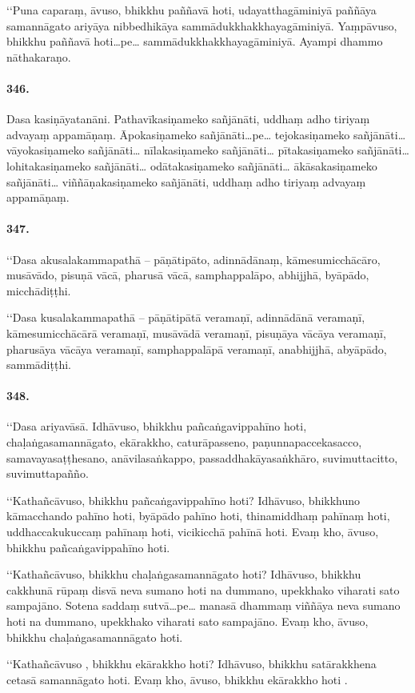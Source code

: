 ‘‘Puna caparaṃ, āvuso, bhikkhu paññavā hoti, udayatthagāminiyā paññāya samannāgato ariyāya nibbedhikāya sammādukkhakkhayagāminiyā. Yaṃpāvuso, bhikkhu paññavā hoti…pe… sammādukkhakkhayagāminiyā. Ayampi dhammo nāthakaraṇo.

\paragraph{346.} Dasa kasiṇāyatanāni. Pathavīkasiṇameko sañjānāti, uddhaṃ adho tiriyaṃ advayaṃ appamāṇaṃ. Āpokasiṇameko sañjānāti…pe… tejokasiṇameko sañjānāti… vāyokasiṇameko sañjānāti… nīlakasiṇameko sañjānāti… pītakasiṇameko sañjānāti… lohitakasiṇameko sañjānāti… odātakasiṇameko sañjānāti… ākāsakasiṇameko sañjānāti… viññāṇakasiṇameko sañjānāti, uddhaṃ adho tiriyaṃ advayaṃ appamāṇaṃ.

\paragraph{347.} ‘‘Dasa akusalakammapathā – pāṇātipāto, adinnādānaṃ, kāmesumicchācāro, musāvādo, pisuṇā vācā, pharusā vācā, samphappalāpo, abhijjhā, byāpādo, micchādiṭṭhi.

‘‘Dasa kusalakammapathā – pāṇātipātā veramaṇī, adinnādānā veramaṇī, kāmesumicchācārā veramaṇī, musāvādā veramaṇī, pisuṇāya vācāya veramaṇī, pharusāya vācāya veramaṇī, samphappalāpā veramaṇī, anabhijjhā, abyāpādo, sammādiṭṭhi.

\paragraph{348.} ‘‘Dasa ariyavāsā. Idhāvuso, bhikkhu pañcaṅgavippahīno hoti, chaḷaṅgasamannāgato, ekārakkho, caturāpasseno, paṇunnapaccekasacco, samavayasaṭṭhesano, anāvilasaṅkappo, passaddhakāyasaṅkhāro, suvimuttacitto, suvimuttapañño.

‘‘Kathañcāvuso, bhikkhu pañcaṅgavippahīno hoti? Idhāvuso, bhikkhuno kāmacchando pahīno hoti, byāpādo pahīno hoti, thinamiddhaṃ pahīnaṃ hoti, uddhaccakukuccaṃ pahīnaṃ hoti, vicikicchā pahīnā hoti. Evaṃ kho, āvuso, bhikkhu pañcaṅgavippahīno hoti.

‘‘Kathañcāvuso, bhikkhu chaḷaṅgasamannāgato hoti? Idhāvuso, bhikkhu cakkhunā rūpaṃ disvā neva sumano hoti na dummano, upekkhako viharati sato sampajāno. Sotena saddaṃ sutvā…pe… manasā dhammaṃ viññāya neva sumano hoti na dummano, upekkhako viharati sato sampajāno. Evaṃ kho, āvuso, bhikkhu chaḷaṅgasamannāgato hoti.

‘‘Kathañcāvuso , bhikkhu ekārakkho hoti? Idhāvuso, bhikkhu satārakkhena cetasā samannāgato hoti. Evaṃ kho, āvuso, bhikkhu ekārakkho hoti .

